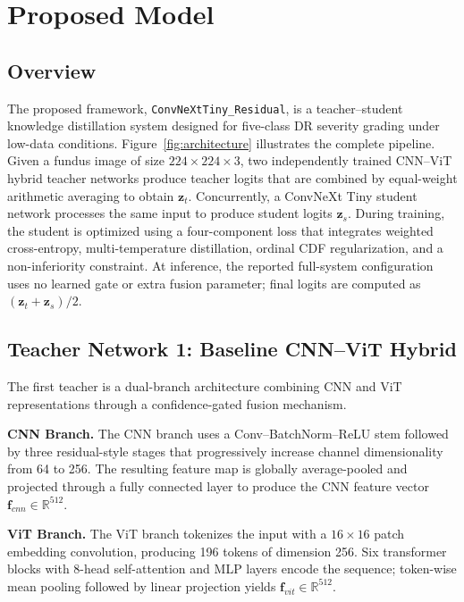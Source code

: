 \documentclass[a4paper,fleqn]{cas-dc}
\begin{document}
\section{Proposed Model}



          \subsection{Overview}
          \label{sec:overview}

          The proposed framework, \texttt{ConvNeXtTiny\_Residual}, is a teacher--student knowledge distillation system designed for five-class DR severity grading under low-data conditions. Figure~\ref{fig:architecture} illustrates the complete pipeline. Given a fundus image of size $224 \times 224 \times 3$, two independently trained CNN--ViT hybrid teacher networks produce teacher logits that are combined by equal-weight arithmetic averaging to obtain $\mathbf{z}_t$. Concurrently, a ConvNeXt Tiny student network \cite{liu2022} processes the same input to produce student logits $\mathbf{z}_s$. During training, the student is optimized using a four-component loss that integrates weighted cross-entropy, multi-temperature distillation, ordinal CDF regularization, and a non-inferiority constraint. At inference, the reported full-system configuration uses no learned gate or extra fusion parameter; final logits are computed as $(\mathbf{z}_t+\mathbf{z}_s)/2$.


          \subsection{Teacher Network 1: Baseline CNN--ViT Hybrid}

          The first teacher is a dual-branch architecture combining CNN and ViT representations through a confidence-gated fusion mechanism.

          \textbf{CNN Branch.} The CNN branch uses a Conv--BatchNorm--ReLU stem followed by three residual-style stages that progressively increase channel dimensionality from 64 to 256. The resulting feature map is globally average-pooled and projected through a fully connected layer to produce the CNN feature vector $\mathbf{f}_{cnn} \in \mathbb{R}^{512}$.

          \textbf{ViT Branch.} The ViT branch tokenizes the input with a $16{\times}16$ patch embedding convolution, producing 196 tokens of dimension 256. Six transformer blocks with 8-head self-attention and MLP layers encode the sequence; token-wise mean pooling followed by linear projection yields $\mathbf{f}_{vit} \in \mathbb{R}^{512}$.
\end{document}
